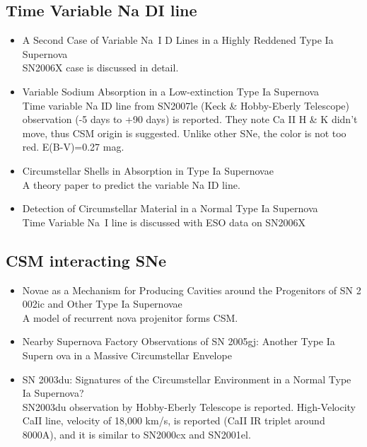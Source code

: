 \subsection{Time Variable Na DI line }
\begin{itemize}
\item A Second Case of Variable Na~I D Lines in a Highly Reddened Type Ia 
Supernova \citep{blondin09a}\\
SN2006X case is discussed in detail.
\item Variable Sodium Absorption in a Low-extinction Type Ia Supernova
\citep{simon09a}\\
Time variable Na ID line from SN2007le (Keck \& Hobby-Eberly Telescope) 
observation (-5 days to +90 days) is reported.
They note Ca II H \& K didn't move, thus CSM origin is suggested.
Unlike other SNe, the color is not too red.  E(B-V)=0.27 mag.
\item Circumstellar Shells in Absorption in Type Ia Supernovae
\citep{borkowski09a}\\
A theory paper to predict the variable Na ID line.
\item Detection of Circumstellar Material in a Normal Type Ia Supernova
\citep[][\#69, 6/2/10]{patat07a} \\
Time Variable Na~I line is discussed with ESO data on SN2006X
\end{itemize}

\subsection{CSM interacting SNe}
\begin{itemize}
\item Novae as a Mechanism for Producing Cavities around the Progenitors of SN 2
002ic and Other Type Ia Supernovae \citep{wood-vasey06a} \\
A model of recurrent nova projenitor forms CSM.
\item Nearby Supernova Factory Observations of SN 2005gj: Another Type Ia Supern
ova in a Massive Circumstellar Envelope
\citep{aldering06a}\\
\item SN 2003du: Signatures of the Circumstellar Environment in a Normal Type Ia Supernova?
\citep[][\#60, 6/2/10, gerardy04a]{gerardy04a}\\
SN2003du observation by Hobby-Eberly Telescope is reported.  High-Velocity CaII line,  
velocity of 18,000 km/s, is reported (CaII IR triplet around 8000A), and it is similar to
SN2000cx and SN2001el.
\end{itemize}

